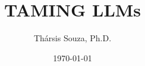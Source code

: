 \documentclass[
	a4paper, %
	fontsize=10pt, %
	twoside=true, %
	numbers=noenddot, %
]{kaobook}
\begin{document}
%




\titlehead{}
\subject{A Practical Guide to LLM Pitfalls with Open Source Software}

\title[TAMING LLMs]{TAMING LLMs}
\subtitle{
}

\author[Thársis Souza, Ph.D.]{Thársis Souza, Ph.D.}

\date{\today}

\publishers{tamingllms.com}


\frontmatter %




\makeatletter
\uppertitleback{\@titlehead} %
\end{document}
